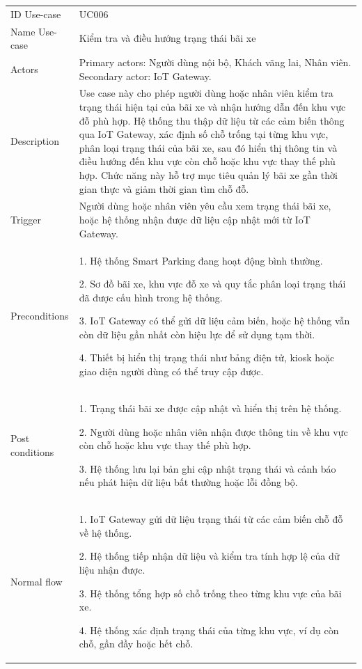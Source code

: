 \renewcommand{\arraystretch}{1.4}
\begin{center}
\begin{longtable}{|m{2.5cm}|m{13cm}|}
\hline
ID Use-case  & UC006 \\ 
Name Use-case & Kiểm tra và điều hướng trạng thái bãi xe \\ 
\hline
Actors & Primary actors: Người dùng nội bộ, Khách vãng lai, Nhân viên. Secondary actor: IoT Gateway.\\
\hline
Description & Use case này cho phép người dùng hoặc nhân viên kiểm tra trạng thái hiện tại của bãi xe và nhận hướng dẫn đến khu vực đỗ phù hợp. Hệ thống thu thập dữ liệu từ các cảm biến thông qua IoT Gateway, xác định số chỗ trống tại từng khu vực, phân loại trạng thái của bãi xe, sau đó hiển thị thông tin và điều hướng đến khu vực còn chỗ hoặc khu vực thay thế phù hợp. Chức năng này hỗ trợ mục tiêu quản lý bãi xe gần thời gian thực và giảm thời gian tìm chỗ đỗ. \\ \hline
Trigger & Người dùng hoặc nhân viên yêu cầu xem trạng thái bãi xe, hoặc hệ thống nhận được dữ liệu cập nhật mới từ IoT Gateway.\\
\hline
Preconditions & 
1. Hệ thống Smart Parking đang hoạt động bình thường.

2. Sơ đồ bãi xe, khu vực đỗ xe và quy tắc phân loại trạng thái đã được cấu hình trong hệ thống.

3. IoT Gateway có thể gửi dữ liệu cảm biến, hoặc hệ thống vẫn còn dữ liệu gần nhất còn hiệu lực để sử dụng tạm thời.

4. Thiết bị hiển thị trạng thái như bảng điện tử, kiosk hoặc giao diện người dùng có thể truy cập được.\\
\hline
Post conditions & 
1. Trạng thái bãi xe được cập nhật và hiển thị trên hệ thống.

2. Người dùng hoặc nhân viên nhận được thông tin về khu vực còn chỗ hoặc khu vực thay thế phù hợp.

3. Hệ thống lưu lại bản ghi cập nhật trạng thái và cảnh báo nếu phát hiện dữ liệu bất thường hoặc lỗi đồng bộ.\\
\hline
Normal flow & 
1. IoT Gateway gửi dữ liệu trạng thái từ các cảm biến chỗ đỗ về hệ thống.

2. Hệ thống tiếp nhận dữ liệu và kiểm tra tính hợp lệ của dữ liệu nhận được.

3. Hệ thống tổng hợp số chỗ trống theo từng khu vực của bãi xe.

4. Hệ thống xác định trạng thái của từng khu vực, ví dụ còn chỗ, gần đầy hoặc hết chỗ.


\end{longtable}
\end{center}
